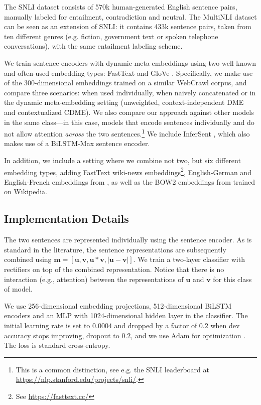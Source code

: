 \documentclass[11pt,a4paper]{article}
\begin{document}
The SNLI dataset consists of 570k human-generated English sentence pairs, manually labeled for entailment,
contradiction and neutral.  The MultiNLI dataset can be seen as an extension of SNLI: it contains 433k sentence pairs, taken from ten different genres (e.g. fiction, government text or spoken telephone conversations), with the same entailment labeling scheme.

We train sentence encoders with dynamic meta-embeddings using two well-known and often-used embedding types: FastText \cite{Mikolov:2018lrec,Bojanowski:2016arxiv} and GloVe \cite{Pennington:2014emnlp}. Specifically, we make use of the 300-dimensional embeddings trained on a similar WebCrawl corpus, and compare three scenarios: when used individually, when naively concatenated or in the dynamic meta-embedding setting (unweighted, context-independent DME and contextualized CDME). We also compare our approach against other models in the same class---in this case, models that encode sentences individually and do not allow attention \emph{across} the two sentences.\footnote{This is a common distinction, see e.g. the SNLI leaderboard at \url{https://nlp.stanford.edu/projects/snli/}.} We include InferSent \cite{Conneau:2017emnlp}, which also makes use of a BiLSTM-Max sentence encoder.

In addition, we include a setting where we combine not two, but six different embedding types, adding FastText wiki-news embeddings\footnote{See \url{https://fasttext.cc/}}, English-German and English-French embeddings from , as well as the BOW2 embeddings from  trained on Wikipedia.

\subsection{Implementation Details}

The two sentences are represented individually using the sentence encoder. As is standard in the literature, the sentence representations are subsequently combined using $\mathbf{m} = [\mathbf{u}, \mathbf{v}, \mathbf{u}*\mathbf{v},|\mathbf{u}-\mathbf{v}|]$. We train a two-layer classifier with rectifiers on top of the combined representation. Notice that there is no interaction (e.g., attention) between the representations of $\mathbf{u}$ and $\mathbf{v}$ for this class of model.

We use 256-dimensional embedding projections,  512-dimensional BiLSTM encoders and an MLP with 1024-dimensional hidden layer in the classifier. The initial learning rate is set to $0.0004$ and dropped by a factor of $0.2$ when dev accuracy stops improving, dropout to $0.2$, and we use Adam for optimization \cite{Kingma:2014arxiv}. The loss is standard cross-entropy.
\end{document}
